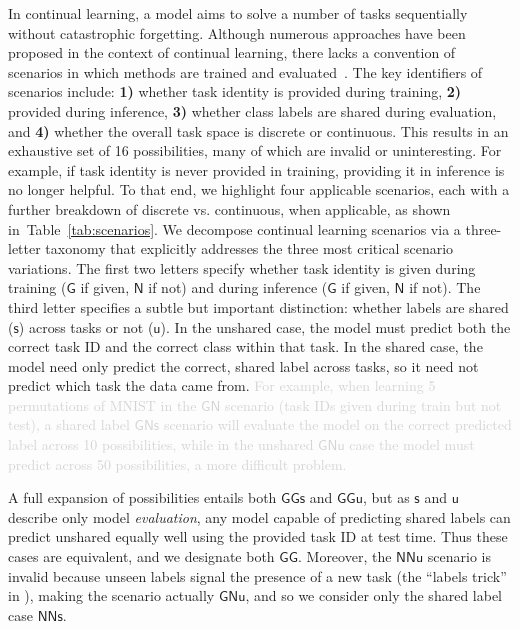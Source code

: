 \documentclass{article}
\newcommand{\comments}[1]{#1}
\newcommand{\comments}[1]{}
\newcommand{\removed}[1]{\comments{\textcolor{lightgray}{#1}}}
\newcommand{\casename}[1]{\ensuremath{\mathsf{#1}}\xspace}
\newcommand{\tabref}[1]{Table~\ref{tab:#1}}
\begin{document}
In continual learning, a model aims to solve a number of tasks sequentially \cite{thrun1998lifelong, zhao1996incremental} without catastrophic forgetting.
Although numerous approaches have been proposed in the context of continual learning, there lacks a convention of  scenarios in which methods are trained and evaluated~\cite{van2019three}. The key identifiers of scenarios include: \textbf{1)} whether task identity is provided during training, \textbf{2)} provided during inference, \textbf{3)} whether class labels are shared during evaluation, 
and \textbf{4)} whether the overall task space is discrete or continuous.
This results in an exhaustive set of 16 possibilities, many of which are invalid or uninteresting. For example, 
if task identity is never provided in training, providing it in inference is no longer helpful.
To that end, we highlight four applicable scenarios, each with a further breakdown of discrete vs. continuous, when applicable, as shown in~\tabref{scenarios}.
%
We decompose continual learning scenarios via a three-letter taxonomy that explicitly addresses the three most critical scenario variations. 
The first two letters specify whether task identity is given during training (\casename{G} if given, \casename{N} if not) and during inference (\casename{G} if given, \casename{N} if not).
The third letter specifies a subtle but important distinction: whether labels are shared (\casename{s}) across tasks or not (\casename{u}).
In the unshared case, the model must predict both the correct task ID and the correct class within that task. In the shared case, the model need only predict the correct, shared label across tasks, so it need not predict which task the data came from.
\removed{For example, when learning 5 permutations of MNIST in the \casename{GN} scenario (task IDs given during train but not test), a shared label \casename{GNs} scenario will evaluate the model on the correct predicted label across 10 possibilities, while in the unshared \casename{GNu} case the model must predict across 50 possibilities, a more difficult problem.}

A full expansion of possibilities entails both \casename{GGs} and \casename{GGu}, but as \casename{s} and \casename{u} describe only model \emph{evaluation}, any model capable of predicting shared labels can predict unshared equally well using the provided task ID at test time. Thus these cases are equivalent, and we designate both \casename{GG}.
Moreover,
the \casename{NNu} scenario is invalid because unseen labels signal the presence of a new task (the ``labels trick'' in \cite{zeno2018task}), making the scenario actually \casename{GNu}, and so we consider only the shared label case \casename{NNs}.
\end{document}
